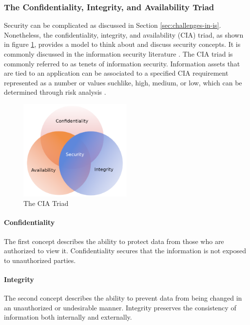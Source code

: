 \subsubsection{The Confidentiality, Integrity, and Availability Triad}
Security can be complicated as discussed in Section \ref{sec:challenges-in-is}. Nonetheless, the confidentiality, integrity, and availability (CIA) triad, as shown in figure \ref{fig:cia}, provides a model to think about and discuss security concepts. It is commonly discussed in the information security literature \cite{andress2014the} \cite{srinivasan2016cissp} \cite{death2017information}. The CIA triad is commonly referred to as tenets of information security. Information assets that are tied to an application can be associated to a specified CIA requirement represented as a number or values suchlike, high, medium, or low, which can be determined through risk analysis \cite{srinivasan2016cissp}. 

\begin{figure}[!h]
    \centering
    \includegraphics[width=0.5\textwidth]{../../img/chapter_2/cia-triad.png}
    \caption{The CIA Triad}\label{fig:cia}
\end{figure}

\paragraph{Confidentiality}
The first concept describes the ability to protect data from those who are authorized to view it. Confidentiality secures that the information is not exposed to unauthorized parties.

\paragraph{Integrity}
The second concept describes the ability to prevent data from being changed in an unauthorized or undesirable manner. Integrity preserves the consistency of information both internally and externally.

